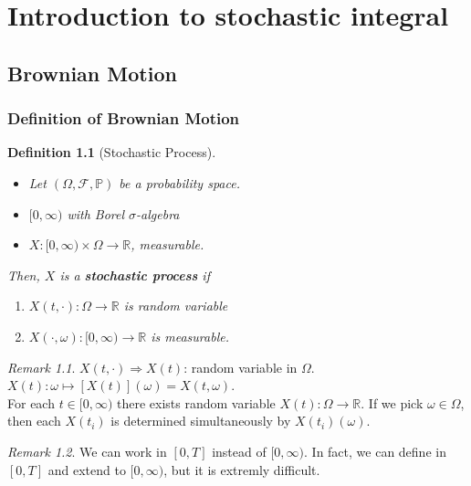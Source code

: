 \documentclass[12pt]{report}
\newcommand{\R}{\mathbb{R}}
\renewcommand{\P}{\mathbb{P}}
\newcommand{\F}{\mathcal{F}}
\renewcommand{\1}{\mathbb{1}}
\renewcommand{\O}{\Omega}
\theoremstyle{break}
\theoremstyle{newdef}
\newtheorem{defn}[thm]{Definition} %
\theoremstyle{remark}
\newtheorem*{rem}{Remark} %
\begin{document}
\part{Introduction to stochastic integral}



\setcounter{chapter}{1}

\chapter{Brownian Motion}
\section{Definition of Brownian Motion}

\begin{defn}[Stochastic Process]
\leavevmode
\vspace{-6mm}
\begin{itemize}
\item Let $(\O, \F, \P)$ be a probability space.
\item $[0,\infty)$ with Borel $\sigma$-algebra
\item $X:[0,\infty) \times \O \rightarrow \R$, measurable.
\end{itemize}
Then, $X$ is a \textbf{stochastic process} if
\begin{enumerate}
\item $X(t,\cdot) : \O \rightarrow \R$ is random variable
\item $X(\cdot,\omega) : [0,\infty) \rightarrow \R$ is measurable.
\end{enumerate}
\end{defn}



\begin{rem}
$X(t,\cdot) \Rightarrow X(t)$: random variable in $\O$.
$X(t) : \omega \mapsto [X(t)](\omega) = X(t,\omega)$.\\
For each $t \in [0,\infty)$ there exists random variable $X(t) : \O\rightarrow \R$.
If we pick $\omega \in \O$, then each $X(t_i)$ is determined simultaneously by $X(t_i)(\omega)$.
\end{rem}


\begin{rem}
We can work in $[0,T]$ instead of $[0,\infty)$.
In fact, we can define in $[0,T]$ and extend to $[0,\infty)$, but it is extremly difficult.
\end{rem}
\end{document}
